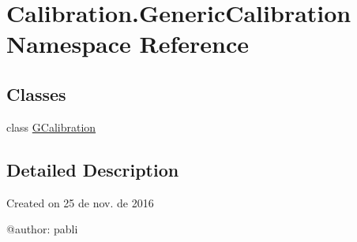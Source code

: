 \hypertarget{namespace_calibration_1_1_generic_calibration}{}\section{Calibration.\+Generic\+Calibration Namespace Reference}
\label{namespace_calibration_1_1_generic_calibration}
\subsection*{Classes}
\begin{DoxyCompactItemize}
\item 
class \hyperlink{class_calibration_1_1_generic_calibration_1_1_g_calibration}{G\+Calibration}
\end{DoxyCompactItemize}


\subsection{Detailed Description}
\begin{DoxyVerb}Created on 25 de nov. de 2016

@author: pabli
\end{DoxyVerb}
 
